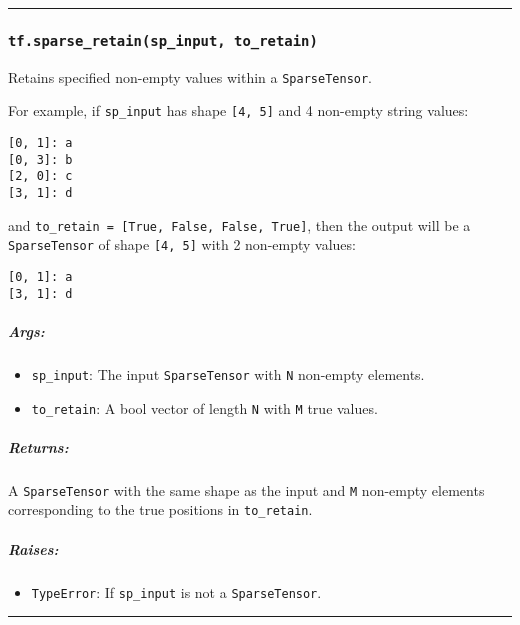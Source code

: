 \begin{center}\rule{0.5\linewidth}{\linethickness}\end{center}

\subsubsection{\texorpdfstring{\texttt{tf.sparse\_retain(sp\_input,\ to\_retain)}
}{tf.sparse\_retain(sp\_input, to\_retain) }}\label{tf.sparseux5fretainspux5finput-toux5fretain}

Retains specified non-empty values within a \texttt{SparseTensor}.

For example, if \texttt{sp\_input} has shape \texttt{{[}4,\ 5{]}} and 4
non-empty string values:

\begin{verbatim}
[0, 1]: a
[0, 3]: b
[2, 0]: c
[3, 1]: d
\end{verbatim}

and \texttt{to\_retain\ =\ {[}True,\ False,\ False,\ True{]}}, then the
output will be a \texttt{SparseTensor} of shape \texttt{{[}4,\ 5{]}}
with 2 non-empty values:

\begin{verbatim}
[0, 1]: a
[3, 1]: d
\end{verbatim}

\subparagraph{Args: }\label{args-6}

\begin{itemize}
\tightlist
\item
  \texttt{sp\_input}: The input \texttt{SparseTensor} with \texttt{N}
  non-empty elements.
\item
  \texttt{to\_retain}: A bool vector of length \texttt{N} with
  \texttt{M} true values.
\end{itemize}

\subparagraph{Returns: }\label{returns-8}

A \texttt{SparseTensor} with the same shape as the input and \texttt{M}
non-empty elements corresponding to the true positions in
\texttt{to\_retain}.

\subparagraph{Raises: }\label{raises-4}

\begin{itemize}
\tightlist
\item
  \texttt{TypeError}: If \texttt{sp\_input} is not a
  \texttt{SparseTensor}.
\end{itemize}

\begin{center}\rule{0.5\linewidth}{\linethickness}\end{center}

